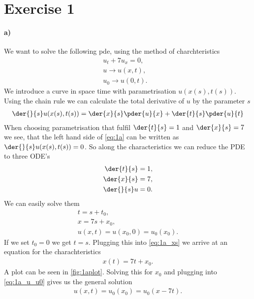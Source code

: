 \section{Exercise 1}
\paragraph{a)}\label{par:a}
We want to solve the following pde, using the method of charchteristics
\begin{align}
u_t + 7u_x=0,&\label{eq:1a}\\
u \rightarrow u(x,t),&\\
u_0 \rightarrow u(0,t).&
\end{align}
We introduce a curve in space time with parametrisation $u(x(s),t(s))$. Using the chain rule we can calculate the total derivative of $u$  by the parameter $s$
\begin{align}
\der{}{s}u(x(s),t(s)) = \der{x}{s}\pder{u}{x} + \der{t}{s}\pder{u}{t}
\end{align}
When choosing parametrisation that fulfil $\der{t}{s} = 1$ and $\der{x}{s}=7$ we see, that the left hand side  of  \cref{eq:1a} can be written as $\der{}{s}u(x(s),t(s))=0$.
So along the characteristics we can reduce the  PDE to three ODE's 
\begin{align}
\der{t}{s} &= 1,\\
\der{x}{s}&=7,\\
\der{}{s}u&=0.
\end{align}
We can easily solve them
\begin{align}
t=s +t_0,\\
x = 7s + x_0,\label{eq:1a_xs}\\
u(x,t) = u(x_0, 0) =u_0(x_0)\label{eq:1a_u_u0} .
\end{align}
If we set $t_0=0$ we get $t=s$. Plugging this into \cref{eq:1a_xs} we arrive at an equation for the charachteristics 
\begin{align}
x(t) = 7t + x_0.\label{eq:1a_charch_curve}
\end{align}
A plot can be seen in \cref{fig:1aplot}.
Solving this for $x_0$ and plugging into \cref{eq:1a_u_u0} gives us the general solution
\begin{align}
u(x,t)=u_0(x_0)=u_0(x-7t).
\end{align}


